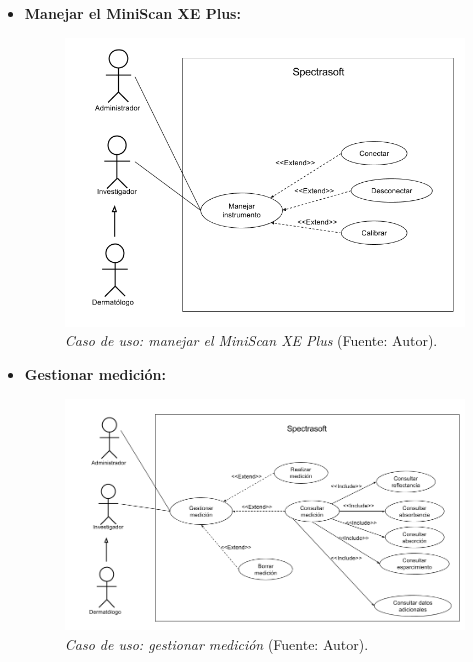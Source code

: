  \begin{itemize}
 	
 	\item \textbf{Manejar el MiniScan XE Plus:}
 	
 		\begin{figure}[H]
		\centering
		\includegraphics[scale=0.4]{img/cu-manejar-miniscan.png}
			\caption[Caso de uso: manejar el MiniScan XE Plus]{\textit{ Caso de uso: manejar el MiniScan XE Plus} (Fuente: Autor).}
	\end{figure}
	
	 	\item \textbf{Gestionar medici\'{o}n:}
 	
 		\begin{figure}[H]
		\centering
		\includegraphics[scale=0.4]{img/cu-gestion-medicion.png}
			\caption[Caso de uso: gestionar medici\'{o}n]{\textit{ Caso de uso: gestionar medici\'{o}n} (Fuente: Autor).}
	\end{figure}


\end{itemize}
